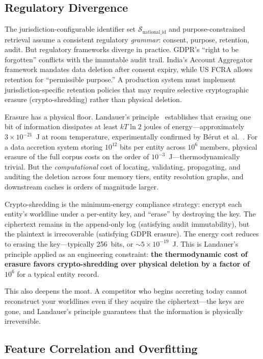 \documentclass[11pt,twocolumn]{article}
\begin{document}
\subsection{Regulatory Divergence}

The jurisdiction-configurable identifier set $\mathcal{S}_{\text{national\_id}}$ and purpose-constrained retrieval assume a consistent regulatory \emph{grammar}: consent, purpose, retention, audit. But regulatory frameworks diverge in practice. GDPR's ``right to be forgotten'' conflicts with the immutable audit trail. India's Account Aggregator framework mandates data deletion after consent expiry, while US FCRA allows retention for ``permissible purpose.'' A production system must implement jurisdiction-specific retention policies that may require selective cryptographic erasure (crypto-shredding) rather than physical deletion.

Erasure has a physical floor. Landauer's principle~\cite{landauer1961} establishes that erasing one bit of information dissipates at least $kT \ln 2$ joules of energy---approximately $3 \times 10^{-21}$~J at room temperature, experimentally confirmed by Bérut et al.~\cite{berut2012}. For a data accretion system storing $10^{12}$ bits per entity across $10^6$ members, physical erasure of the full corpus costs on the order of $10^{-3}$~J---thermodynamically trivial. But the \emph{computational} cost of locating, validating, propagating, and auditing the deletion across four memory tiers, entity resolution graphs, and downstream caches is orders of magnitude larger.

Crypto-shredding is the minimum-energy compliance strategy: encrypt each entity's worldline under a per-entity key, and ``erase'' by destroying the key. The ciphertext remains in the append-only log (satisfying audit immutability), but the plaintext is irrecoverable (satisfying GDPR erasure). The energy cost reduces to erasing the key---typically 256~bits, or $\sim 5 \times 10^{-19}$~J. This is Landauer's principle applied as an engineering constraint: \textbf{the thermodynamic cost of erasure favors crypto-shredding over physical deletion by a factor of $10^6$} for a typical entity record.

This also deepens the moat. A competitor who begins accreting today cannot reconstruct your worldlines even if they acquire the ciphertext---the keys are gone, and Landauer's principle guarantees that the information is physically irreversible.

\subsection{Feature Correlation and Overfitting}
\end{document}
